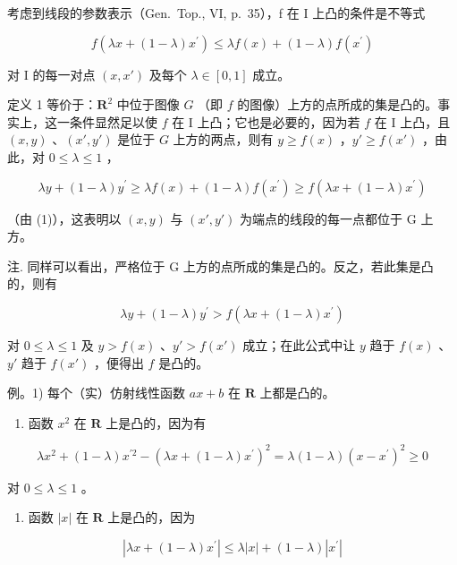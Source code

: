考虑到线段的参数表示（Gen.~Top., VI, p.~35），f 在 I 上凸的条件是不等式

\[
f (\lambda x + (1 - \lambda) x ^ {\prime}) \leqslant \lambda f (x) + (1 - \lambda) f (x ^ {\prime})\tag{1}
\]

对 I 的每一对点 \((x, x')\) 及每个 \(\lambda \in [0, 1]\) 成立。

定义 1 等价于：\(\mathbf{R}^2\) 中位于图像 \(G\) （即 \(f\) 的图像）上方的点所成的集是凸的。事实上，这一条件显然足以使 \(f\) 在 I 上凸；它也是必要的，因为若 \(f\) 在 I 上凸，且 \((x,y)\) 、\((x',y')\) 是位于 \(G\) 上方的两点，则有 \(y \geqslant f(x)\) ，\(y' \geqslant f(x')\) ，由此，对 \(0 \leqslant \lambda \leqslant 1\) ，

\[
\lambda y + (1 - \lambda) y ^ {\prime} \geqslant \lambda f (x) + (1 - \lambda) f \left(x ^ {\prime}\right) \geqslant f (\lambda x + (1 - \lambda) x ^ {\prime})
\]

（由 (1)），这表明以 \((x, y)\) 与 \((x', y')\) 为端点的线段的每一点都位于 G 上方。

注. 同样可以看出，严格位于 G 上方的点所成的集是凸的。反之，若此集是凸的，则有

\[
\lambda y + (1 - \lambda) y ^ {\prime} > f (\lambda x + (1 - \lambda) x ^ {\prime})
\]

对 \(0 \leqslant \lambda \leqslant 1\) 及 \(y > f(x)\) 、\(y' > f(x')\) 成立；在此公式中让 \(y\) 趋于 \(f(x)\) 、\(y'\) 趋于 \(f(x')\) ，便得出 \(f\) 是凸的。

例。1) 每个（实）仿射线性函数 \(ax + b\) 在 \(\mathbf{R}\) 上都是凸的。

\begin{enumerate}
\def\labelenumi{\arabic{enumi})}
\setcounter{enumi}{1}
\tightlist
\item
  函数 \(x^{2}\) 在 \(\mathbf{R}\) 上是凸的，因为有
\end{enumerate}

\[
\lambda x ^ {2} + (1 - \lambda) x ^ {\prime 2} - \left(\lambda x + (1 - \lambda) x ^ {\prime}\right) ^ {2} = \lambda (1 - \lambda) (x - x ^ {\prime}) ^ {2} \geqslant 0
\]

对 \(0 \leqslant \lambda \leqslant 1\) 。

\begin{enumerate}
\def\labelenumi{\arabic{enumi})}
\setcounter{enumi}{2}
\tightlist
\item
  函数 \(|x|\) 在 \(\mathbf{R}\) 上是凸的，因为
\end{enumerate}

\[
\left| \lambda x + (1 - \lambda) x ^ {\prime} \right| \leqslant \lambda | x | + (1 - \lambda) \left| x ^ {\prime} \right|
\]

